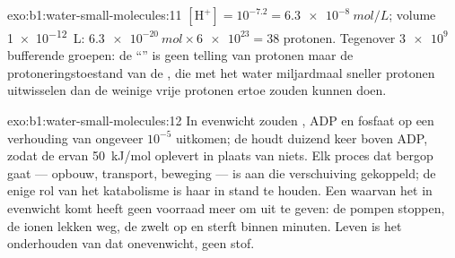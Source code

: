 \begin{solution}{exo:b1:water-small-molecules:11}
$[\mathrm{H^+}] = 10^{-7.2} = \qty{6.3e-8}{mol/L}$; volume
\qty{1e-12}{L}: $\qty{6.3e-20}{mol}\times\num{6e23} = 38$ protonen. Tegenover
$\num{3e9}$ bufferende groepen: de ``'' is geen telling van protonen maar de
protoneringstoestand van de , die met het water miljardmaal sneller
protonen uitwisselen dan de weinige vrije protonen ertoe zouden kunnen doen.
\end{solution}

\begin{solution}{exo:b1:water-small-molecules:12}
In evenwicht zouden , ADP en fosfaat op een verhouding van ongeveer $10^{-5}$
uitkomen; de  houdt  duizend keer boven ADP, zodat de  ervan
\qty{50}{kJ/mol} oplevert in plaats van niets. Elk proces dat bergop gaat ---
opbouw, transport, beweging --- is aan die verschuiving gekoppeld; de enige rol
van het katabolisme is haar in stand te houden. Een  waarvan het  in
evenwicht komt heeft geen voorraad meer om uit te geven: de pompen stoppen, de
ionen lekken weg, de  zwelt op en sterft binnen minuten. Leven is het
onderhouden van dat onevenwicht, geen stof.
\end{solution}

